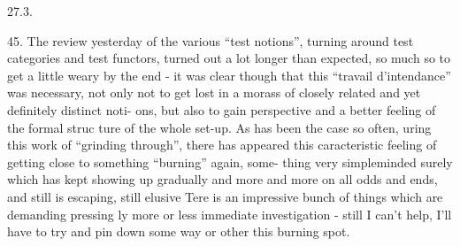 27.3.

45.    The review yesterday of the various ``test notions'',  turning
around test categories and test functors,  turned out a lot longer than
expected,  so much so  to  get a little weary by the end  -  it was clear
though that this ``travail d'intendance'' was necessary,  not only not to
get lost in a morass of closely related and yet definitely distinct noti-%
ons,  but also to gain perspective and a better feeling of the formal struc%
ture of the whole set-up.  As has been the case so often, uring this
 work of ``grinding through'',  there has appeared  this
caracteristic feeling of getting close to something ``burning'' again, some-%
thing very simple\unsure{-}minded surely which has kept showing up gradually and
more and more on all odds and ends,  and  still is escaping,  still elusive
Tere is an impressive bunch of things  which are demanding pressing%
ly  more or less immediate investigation  -  still I can't help,  I'll
have to try and pin down some way or other this burning spot.

